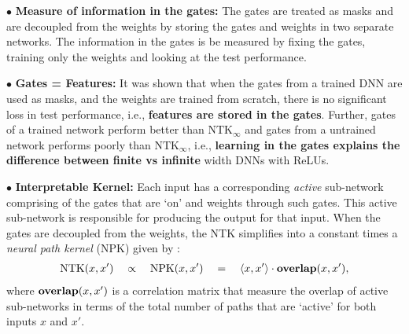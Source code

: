 $\bullet$ \textbf{Measure of information in the gates:} The gates are treated as masks and are decoupled from the weights by storing the gates and weights in two separate networks. The information in the gates is be measured by fixing the gates, training only the weights and looking at the test performance.  

$\bullet$ \textbf{Gates = Features:} It was shown that when the gates from a trained DNN are used as masks, and the weights are trained from scratch, there is no significant loss in test performance, i.e., \textbf{features are stored in the gates}. Further, gates of a trained network perform better than $\text{NTK}_{\infty}$ and gates from a untrained network performs poorly than $\text{NTK}_{\infty}$, i.e., \textbf{learning in the gates explains the difference between finite vs infinite} width DNNs with ReLUs.

$\bullet$ \textbf{Interpretable Kernel:} Each input has a corresponding \emph{active} sub-network comprising of the gates that are `on' and weights through such gates. This active sub-network is responsible for producing the output for that input. When the gates are decoupled from the weights, the NTK simplifies into a constant times a \emph{neural path kernel} (NPK) given by :
\begin{align}\label{eq:ntk-npk-relation}
\text{NTK}(x,x')\quad\propto\quad \text{NPK}(x,x')\quad =\quad \langle x,x'\rangle\cdot {\bf{overlap}}(x,x'),
\end{align}
where ${\bf{overlap}}(x,x')$ is a correlation matrix that measure the overlap of active sub-networks in terms of the  total number of paths that are `active' for both inputs $x$ and $x'$. 

